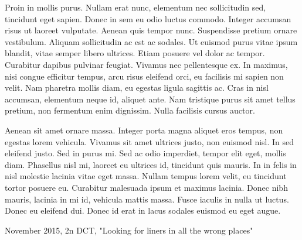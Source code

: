 \documentclass{lowell-prop}
\begin{document}
%

\feasibility 

Proin in mollis purus. Nullam erat nunc, elementum nec sollicitudin sed, tincidunt eget sapien. Donec in sem eu odio luctus commodo. Integer accumsan risus ut laoreet vulputate. Aenean quis tempor nunc. Suspendisse pretium ornare vestibulum. Aliquam sollicitudin ac est ac sodales. Ut euismod purus vitae ipsum blandit, vitae semper libero ultrices. Etiam posuere vel dolor ac tempor. Curabitur dapibus pulvinar feugiat. Vivamus nec pellentesque ex. In maximus, nisi congue efficitur tempus, arcu risus eleifend orci, eu facilisis mi sapien non velit. Nam pharetra mollis diam, eu egestas ligula sagittis ac. Cras in nisl accumsan, elementum neque id, aliquet ante. Nam tristique purus sit amet tellus pretium, non fermentum enim dignissim. Nulla facilisis cursus auctor.

Aenean sit amet ornare massa. Integer porta magna aliquet eros tempus, non egestas lorem vehicula. Vivamus sit amet ultrices justo, non euismod nisl. In sed eleifend justo. Sed in purus mi. Sed ac odio imperdiet, tempor elit eget, mollis diam. Phasellus nisl mi, laoreet eu ultrices id, tincidunt quis mauris. In in felis in nisl molestie lacinia vitae eget massa. Nullam tempus lorem velit, eu tincidunt tortor posuere eu. Curabitur malesuada ipsum et maximus lacinia. Donec nibh mauris, lacinia in mi id, vehicula mattis massa. Fusce iaculis in nulla ut luctus. Donec eu eleifend dui. Donec id erat in lacus sodales euismod eu eget augue.


\thepast
November 2015, 2n DCT, "Looking for liners in all the wrong places"  

\end{document}
